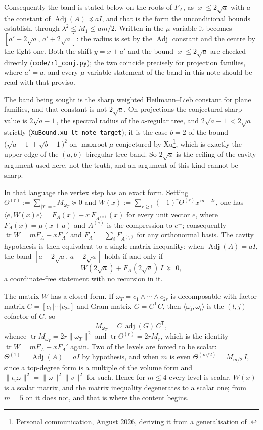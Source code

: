 \documentclass[11pt]{article}
\theoremstyle{remark}
\begin{document}
Consequently the band is stated below on the roots of $F_A$, as $|x|\le2\sqrt a$ with $a$ the
constant of $\operatorname{Adj}(A)\preceq aI$, and that is the form the unconditional bounds
establish, through $\lambda^2\le M_1\le am/2$. Written in the $\mu$ variable it becomes
$[a'-2\sqrt a,\,a'+2\sqrt a]$: the radius is set by the $\operatorname{Adj}$ constant and the
centre by the tight one. Both the shift $y=x+a'$ and the bound $|x|\le2\sqrt a$ are checked
directly (\texttt{code/rl\_conj.py}); the two coincide precisely for projection families, where
$a'=a$, and every $\mu$-variable statement of the band in this note should be read with that
proviso.

The band being sought is the sharp weighted Heilmann--Lieb constant for plane families, and that
constant is not $2\sqrt a$. On projections the conjectural sharp value is $2\sqrt{a-1}$, the
spectral radius of the $a$-regular tree, and $2\sqrt{a-1}<2\sqrt a$ strictly
(\texttt{XuBound.xu\_lt\_note\_target}); it is the case $b=2$ of the bound
$\bigl(\sqrt{a-1}+\sqrt{b-1}\bigr)^2$ on $\operatorname{maxroot}\mu$ conjectured by
Xu\footnote{Personal communication, August 2026, deriving it from a generalisation of
\cite[Conjecture 1]{RL}.}, which is exactly the upper edge of the $(a,b)$-biregular tree band.
So $2\sqrt a$ is the ceiling of the cavity argument used here, not the truth, and an argument of
this kind cannot be sharp.

In that language the vertex step has an exact form. Setting
$\Theta^{(r)}:=\sum_{|T|=r}M_{\omega_T}\succeq0$ and
$W(x):=\sum_{r\ge1}(-1)^r\Theta^{(r)}x^{\,m-2r}$, one has
$\langle e,W(x)e\rangle=F_A(x)-x\,F_{A^{(e)}}(x)$ for every unit vector $e$, where
$F_A(x)=\mu(x+a)$ and $A^{(e)}$ is the compression to $e^\perp$; consequently
$\operatorname{tr}W=mF_A-xF_A'$ and $F_A'=\sum_iF_{A^{(e_i)}}$ for any orthonormal
basis. The cavity hypothesis is then equivalent to a single matrix inequality: when
$\operatorname{Adj}(A)=aI$, the band $[a-2\sqrt a,\,a+2\sqrt a]$ holds if and only if
\[
W(2\sqrt a)+F_A(2\sqrt a)\,I\ \succeq\ 0 ,
\]
a coordinate-free statement with no recursion in it.

The matrix $W$ has a closed form. If $\omega_T=c_1\wedge\cdots\wedge c_{2r}$ is
decomposable with factor matrix $C=[c_1|\cdots|c_{2r}]$ and Gram matrix $G=C^{\mathsf T}C$,
then $\langle\omega_{\hat\jmath},\omega_{\hat l}\rangle$ is the $(l,j)$ cofactor of
$G$, so
\begin{equation}\label{eq:Momega}
M_{\omega_T}=C\,\operatorname{adj}(G)\,C^{\mathsf T},
\end{equation}
whence $\operatorname{tr}M_{\omega_T}=2r\|\omega_T\|^2$ and
$\operatorname{tr}\Theta^{(r)}=2rM_r$, which is the identity
$\operatorname{tr}W=mF_A-xF_A'$ again. Two of the levels are forced to be scalar:
$\Theta^{(1)}=\operatorname{Adj}(A)=aI$ by hypothesis, and when $m$ is even
$\Theta^{(m/2)}=M_{m/2}\,I$, since a top-degree form is a multiple of the volume
form and $\|\iota_v\omega\|^2=\|\omega\|^2\|v\|^2$ for such. Hence for $m\le4$ every
level is scalar, $W(x)$ is a scalar matrix, and the matrix inequality degenerates to
a scalar one; from $m=5$ on it does not, and that is where the content begins.
\end{document}
